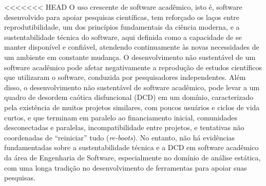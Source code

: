 <<<<<<< HEAD
O uso crescente de software acadêmico, isto é, 
software desenvolvido para apoiar pesquisas científicas,
tem reforçado os laços entre 
reprodutibilidade, um dos princípios fundamentais da ciência moderna,
e a sustentabilidade técnica do software,
aqui definida como a capacidade de se manter disponível e confiável,
atendendo continuamente às novas necessidades de um ambiente em constante mudança.
%
O desenvolvimento não sustentável de um software acadêmico pode 
afetar negativamente a reprodução de estudos científicos que utilizaram o software,
conduzida por pesquisadores independentes. 
Além disso, o desenvolvimento não sustentável de software acadêmico,
pode levar a um quadro de desordem caótica disfuncional (DCD) em um domínio,
caracterizado pela existência de muitos projetos similares, com poucos
usuários e ciclos de vida curtos, e que terminam em paralelo ao financiamento
inicial,  comunidades desconectadas e paralelas, incompatibilidade entre
projetos, e tentativas não coordenadas de ``reiniciar'' tudo
({\it re-boots}).
%
No entanto, não há evidências fundamentadas sobre a sustentabilidade técnica
e a DCD em software acadêmico da área de Engenharia de Software, especialmente
no domínio de análise estática, com uma longa tradição no
desenvolvimento de ferramentas para apoiar suas pesquisas.

